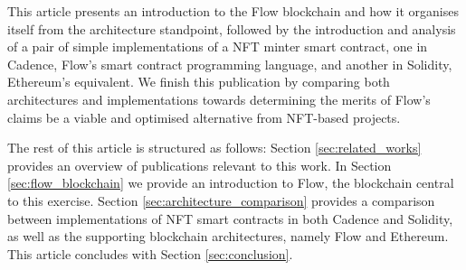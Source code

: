 \documentclass[../NFTComp_IEEE.tex]{subfiles}
\begin{document}
\par
This article presents an introduction to the Flow blockchain and how it organises itself from the architecture standpoint, followed by the introduction and analysis of a pair of simple implementations of a NFT minter smart contract, one in Cadence, Flow's smart contract programming language, and another in Solidity, Ethereum's equivalent. We finish this publication by comparing both architectures and implementations towards determining the merits of Flow's claims be a viable and optimised alternative from NFT-based projects.
\par
The rest of this article is structured as follows: Section \ref{sec:related_works} provides an overview of publications relevant to this work. In Section \ref{sec:flow_blockchain} we provide an introduction to Flow, the blockchain central to this exercise. Section \ref{sec:architecture_comparison} provides a comparison between implementations of NFT smart contracts in both Cadence and Solidity, as well as the supporting blockchain architectures, namely Flow and Ethereum. This article concludes with Section \ref{sec:conclusion}.
\end{document}
